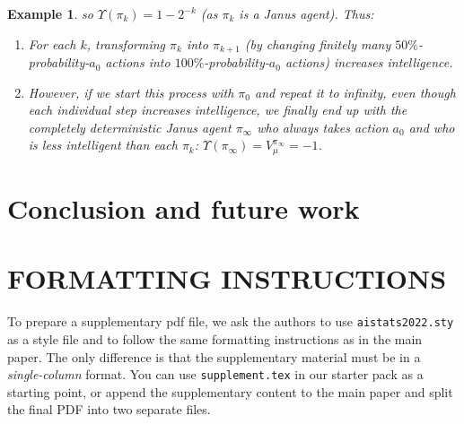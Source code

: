 \documentclass[twoside]{article}
\newtheorem{example}[theorem]{Example}
\begin{document}
\begin{example}
    so $\Upsilon(\pi_k)=1-2^{-k}$ (as $\pi_k$ is a Janus agent).
    Thus:
    \begin{enumerate}
        \item For each $k$, transforming $\pi_k$ into $\pi_{k+1}$
            (by changing finitely many $50\%$-probability-$a_0$
            actions into $100\%$-probability-$a_0$ actions)
            \emph{increases} intelligence.
        \item However, if we start this process with $\pi_0$ and
            repeat it to infinity, even though each individual step
            \emph{increases} intelligence, we finally end up with
            the completely deterministic
            Janus agent $\pi_{\infty}$ who always takes action $a_0$ and who is
            \emph{less} intelligent than each $\pi_k$:
            $\Upsilon(\pi_{\infty})=V^{\pi_\infty}_\mu=-1$.
    \end{enumerate}
\end{example}

\section{Conclusion and future work}



%
%
%
%
%

\pagebreak

\onecolumn


\section{FORMATTING INSTRUCTIONS}

To prepare a supplementary pdf file, we ask the authors to use \texttt{aistats2022.sty} as a style file and to follow the same formatting instructions as in the main paper.
The only difference is that the supplementary material must be in a \emph{single-column} format.
You can use \texttt{supplement.tex} in our starter pack as a starting point, or append the supplementary content to the main paper and split the final PDF into two separate files.
\end{document}
